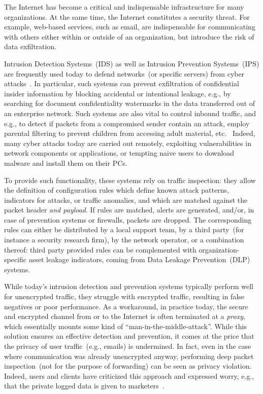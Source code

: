 \documentclass{sig-alternate-10pt}
\begin{document}
The Internet has become a critical and indispensable infrastructure 
for many organizations. At the same time, the Internet constitutes a security threat.
For example, web-based services, such as email, 
are indispensable for communicating with others either within 
or outside
of an organization, but introduce the risk of data exfiltration. 

Intrusion Detection Systems~(IDS) as well as Intrusion
Prevention Systems~(IPS) are frequently used 
today to defend networks~(or specific servers) from cyber attacks~\cite{bro,snort}.
In particular, such systems
can prevent exfiltration of confidential insider information
by blocking accidental or intentional leakage, e.g., by searching for document confidentiality watermarks in the
data transferred out of an enterprise network.
Such systems are also vital to control inbound traffic, and 
e.g., to
detect if packets from a compromised
sender contain an attack, 
employ parental
filtering to prevent children from accessing adult material,
etc.~\cite{blindbox}
Indeed, many cyber attacks today are carried out remotely, exploiting 
vulnerabilities in network components or applications, or tempting naive users 
to download malware and install them on their PCs. 

To provide such functionality, these systems rely on
traffic inspection: they allow the definition of
configuration rules which 
define known attack patterns, indicators for attacks, or traffic anomalies,
and which are matched against the packet header \emph{and payload}. 
If rules are matched, alerts are generated, and/or, in case of 
prevention systems or firewalls, packets are
dropped.
The corresponding rules can either be distributed by a
local support team, by a 
third party~(for instance a security research firm), by the network 
operator, or a combination thereof: 
third party provided rules can be complemented with 
organization-specific asset leakage indicators,
coming from Data
Leakage Prevention~(DLP) systems.

While today's intrusion detection and prevention systems typically perform 
well for unencrypted traffic, 
they struggle with encrypted traffic, resulting in false negatives or 
poor performance. As a workaround, in practice today, the secure and 
encrypted channel from or to the Internet is often terminated at a \emph{proxy},
which essentially mounts some kind of ``man-in-the-middle-attack''. 
While this solution ensures an effective detection and prevention, 
it comes at the price that the privacy of user traffic~(e.g., emails) is undermined. 
In fact, even in the case where communication was already unencrypted
anyway, performing deep packet inspection~(not for the purpose 
of forwarding) can be seen as privacy violation. 
Indeed, users and clients have criticized this approach
and expressed worry, e.g., that the private
logged data is given to marketers~\cite{blindbox,unhappy1,unhappy2}.
\end{document}
